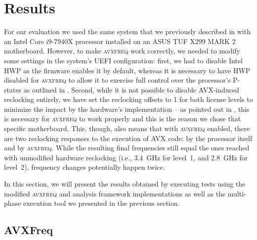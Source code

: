 \section{Results}
\label{sec:evaluation:results}

For our evaluation we used the same system that we previously described in  with an Intel Core i9-7940X processor installed on an ASUS TUF X299 MARK 2 motherboard. However, to make \textsc{avxfreq} work correctly, we needed to modify some settings in the system's \gls{UEFI} configuration: first, we had to disable Intel \gls{HWP} as the firmware enables it by default, whereas it is necessary to have \gls{HWP} disabled for \textsc{avxfreq} to allow it to exercise full control over the processor's \glspl{P-state} as outlined in . Second, while it is not possible to disable \gls{AVX}-induced reclocking entirely, we have set the reclocking offsets to 1 for both license levels to minimize the impact by the hardware's implementation -- as pointed out in , this is necessary for \textsc{avxfreq} to work properly and this is the reason we chose that specific motherboard. This, though, also means that with \textsc{avxfreq} enabled, there are two reclocking responses to the execution of \gls{AVX} code: by the processor itself and by \textsc{avxfreq}. While the resulting final frequencies still equal the ones reached with unmodified hardware reclocking (i.e., \SI{3.4}{\giga\hertz} for level~1, and \SI{2.8}{\giga\hertz} for level~2), frequency changes potentially happen twice.

In this section, we will present the results obtained by executing tests using the modified \textsc{avxfreq} and analysis framework implementations as well as the multi-phase execution tool we presented in the previous section.

\subsection{AVXFreq}
\label{sec:evaluation:results:avxfreq}

